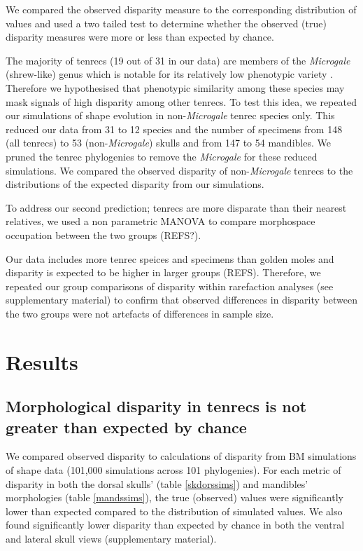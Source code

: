 \documentclass[12pt,a4paper]{article}
\begin{document}

We compared the observed disparity measure to the corresponding distribution of values and used a two tailed test to determine whether the observed (true) disparity measures were more or less than expected by chance.

The majority of tenrecs (19 out of 31 in our data) are members of the \textit{Microgale} (shrew-like) genus which is notable for its relatively low phenotypic variety \citep{ Soarimalala2011, Jenkins2003}. Therefore we hypothesised that phenotypic similarity among these species may mask signals of high disparity among other tenrecs. To test this idea, we repeated our simulations of shape evolution in non-\textit{Microgale} tenrec species only. This reduced our data from 31 to 12 species and the number of specimens from 148 (all tenrecs) to 53 (non-\textit{Microgale}) skulls and from 147 to 54 mandibles. We pruned the tenrec phylogenies to remove the \textit{Microgale} for these reduced simulations. We compared the observed disparity of non-\textit{Microgale} tenrecs to the distributions of the expected disparity from our simulations. 


To address our second prediction; tenrecs are more disparate than their nearest relatives, we used a non parametric MANOVA \citep{Anderson2001} to compare morphospace occupation between the two groups (REFS?). 

Our data includes more tenrec speices and specimens than golden moles and disparity is expected to be higher in larger groups (REFS). Therefore, we repeated our group comparisons of disparity within rarefaction analyses (see supplementary material) to confirm that observed differences in disparity between the two groups were not artefacts of differences in sample size.



\section{Results}

\subsection{Morphological disparity in tenrecs is not greater than expected by chance}

We compared observed disparity to calculations of disparity from BM simulations of shape data (101,000 simulations across 101 phylogenies). For each metric of disparity in both the dorsal skulls' (table \ref{skdorssims}) and mandibles' morphologies (table \ref{mandssims}), the true (observed) values were significantly lower than expected compared to the distribution of simulated values. We also found significantly lower disparity than expected by chance in both the ventral and lateral skull views (supplementary material).
\end{document}
